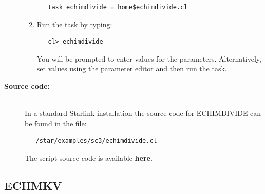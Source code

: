 \documentclass[twoside,11pt]{article}
\newenvironment{latexonly}{}{}
\newcommand{\htmlref}[2]{#1}
\newcommand{\xlabel}[1]{}
\begin{document}
\begin{description}
\begin{enumerate}
\begin{verbatim}
   task echimdivide = home$echimdivide.cl
\end{verbatim}

\item Run the task by typing:

\begin{verbatim}
   cl> echimdivide
\end{verbatim}

      You will be prompted
      to enter values for the parameters. Alternatively, set values
      using the parameter editor and then run the task.
\end{enumerate}

\item [{\bf Source code:}] \mbox{} \\
\begin{latexonly}
In a standard Starlink installation the source code for ECHIMDIVIDE can be
found in the file:
\begin{verbatim}
   /star/examples/sc3/echimdivide.cl
\end{verbatim}
\end{latexonly}
\begin{htmlonly}
      The script source code is available
      \htmlref{{\bf here}}{se_echimdivide_source}.
\end{htmlonly}

\end{description}

\newpage
\subsection{\label{se_echmkv}\xlabel{ECHMKV}ECHMKV}
\end{document}
